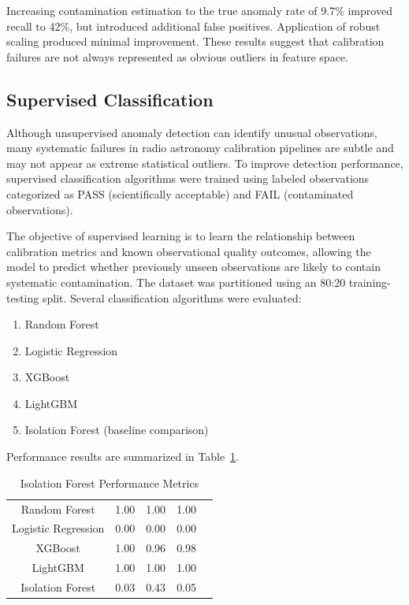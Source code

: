 \documentclass[linenumbers,trackchanges]{aastex701}
\begin{document}
Increasing contamination estimation to the true anomaly rate of 9.7\% improved recall to 42\%, but introduced additional false positives. Application of robust scaling produced minimal improvement. These results suggest that calibration failures are not always represented as obvious outliers in feature space.

\subsection{Supervised Classification}

Although unsupervised anomaly detection can identify unusual observations, many systematic failures in radio astronomy calibration pipelines are subtle and may not appear as extreme statistical outliers. To improve detection performance, supervised classification algorithms were trained using labeled observations categorized as PASS (scientifically acceptable) and FAIL (contaminated observations).

The objective of supervised learning is to learn the relationship between calibration metrics and known observational quality outcomes, allowing the model to predict whether previously unseen observations are likely to contain systematic contamination. The dataset was partitioned using an 80:20 training-testing split. Several classification algorithms were evaluated:
\begin{enumerate}
\item Random Forest
\item Logistic Regression
\item XGBoost
\item LightGBM
\item Isolation Forest (baseline comparison)
\end{enumerate}
Performance results are summarized in Table~\ref{tab:table2}.
\begin{table}
\label{tab:table2}
\centering
\caption{Isolation Forest Performance Metrics}
\begin{tabular}{ccccc}
Random Forest	& 1.00 &	1.00	 & 1.00\\
Logistic Regression	& 0.00	& 0.00 &	0.00\\
XGBoost	& 1.00 &	0.96	& 0.98 \\
LightGBM	& 1.00	& 1.00	& 1.00 \\
Isolation Forest	& 0.03	& 0.43	& 0.05
\end{tabular}
\end{table}
\end{document}
